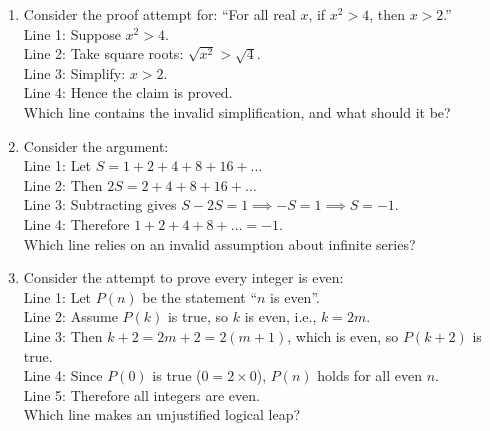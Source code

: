 \documentclass[11pt,a4paper]{article}
\begin{document}
\begin{enumerate}

\item Consider the proof attempt for: ``For all real $x$, if $x^2 > 4$, then $x > 2$.''\\
Line 1: Suppose $x^2 > 4$.\\
Line 2: Take square roots: $\sqrt{x^2} > \sqrt{4}$.\\
Line 3: Simplify: $x > 2$.\\
Line 4: Hence the claim is proved.\\
Which line contains the invalid simplification, and what should it be?


\item Consider the argument:\\
Line 1: Let $S = 1 + 2 + 4 + 8 + 16 + \dots$\\
Line 2: Then $2S = 2 + 4 + 8 + 16 + \dots$\\
Line 3: Subtracting gives $S - 2S = 1 \implies -S = 1 \implies S = -1$.\\
Line 4: Therefore $1 + 2 + 4 + 8 + \dots = -1$.\\
Which line relies on an invalid assumption about infinite series?


\item Consider the attempt to prove every integer is even:\\
Line 1: Let $P(n)$ be the statement ``$n$ is even''.\\
Line 2: Assume $P(k)$ is true, so $k$ is even, i.e., $k = 2m$.\\
Line 3: Then $k+2 = 2m+2 = 2(m+1)$, which is even, so $P(k+2)$ is true.\\
Line 4: Since $P(0)$ is true ($0 = 2 \times 0$), $P(n)$ holds for all even $n$.\\
Line 5: Therefore all integers are even.\\
Which line makes an unjustified logical leap?


\end{enumerate}
\end{document}
